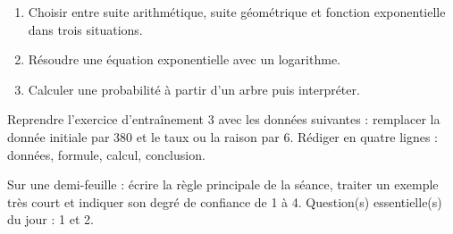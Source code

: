 \begin{exercice}[-- essentiel]
\begin{enumerate}\item Choisir entre suite arithmétique, suite géométrique et fonction exponentielle dans trois situations.\item Résoudre une équation exponentielle avec un logarithme.\item Calculer une probabilité à partir d'un arbre puis interpréter.\end{enumerate}
\end{exercice}


\begin{dm}Reprendre l'exercice d'entraînement 3 avec les données suivantes : remplacer la donnée initiale par $380$ et le taux ou la raison par $6$. Rédiger en quatre lignes : données, formule, calcul, conclusion.\end{dm}

\begin{sortie}Sur une demi-feuille : écrire la règle principale de la séance, traiter un exemple très court et indiquer son degré de confiance de 1 à 4. Question(s) essentielle(s) du jour : 1 et 2.\end{sortie}

